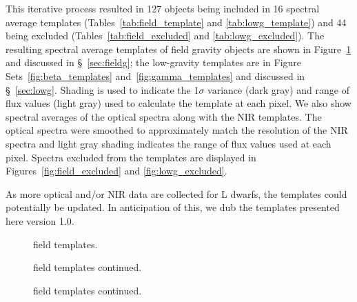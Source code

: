 \documentclass[12pt]{aastex6}
\begin{document}
This iterative process resulted in 127 objects being included in 16 spectral average templates (Tables~\ref{tab:field_template} and \ref{tab:lowg_template}) and 44 being excluded (Tables~\ref{tab:field_excluded} and \ref{tab:lowg_excluded}).
The resulting spectral average templates of field gravity objects are shown in Figure~\ref{fig:field_templates} and discussed in \S~\ref{sec:fieldg}; the low-gravity templates are in Figure Sets~\ref{fig:beta_templates} and~\ref{fig:gamma_templates} and discussed in \S~\ref{sec:lowg}.
Shading is used to indicate the 1$\sigma$ variance (dark gray) and range of flux values (light gray) used to calculate the template at each pixel.
We also show spectral averages of the optical spectra along with the NIR templates. The optical spectra were smoothed to approximately match the resolution of the NIR spectra and light gray shading indicates the range of flux values used at each pixel.
Spectra excluded from the templates are displayed in Figures~\ref{fig:field_excluded} and \ref{fig:lowg_excluded}.

As more optical and/or NIR data are collected for L dwarfs, the templates could potentially be updated.
In anticipation of this, we dub the templates presented here version 1.0.

\begin{figure}
  \caption{field templates.}
  \label{fig:field_templates}
\end{figure}

\begin{figure}
  \caption{field templates continued.}
\end{figure}

\begin{figure}
  \caption{field templates continued.}
\end{figure}
\end{document}
